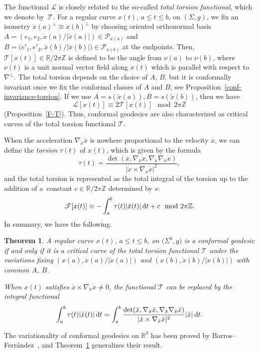 \documentclass[pdftex]{sigma}
\numberwithin{equation}{section}
\newtheorem{Theorem}{Theorem}[section]
\begin{document}
The functional $\mathscr{L}$ is closely related to the so-called {\it total torsion functional}, which we denote by~$\mathscr{T}$. For a regular curve $x(t)$, $a\le t\le b$, on $(\Sigma, g)$, we fix an isometry $\dot x(a)^\perp\cong\dot x(b)^\perp$ by choosing oriented orthonormal basis $A=(e_1, e_2, \dot x(a)/|\dot x(a)|)\in \mathcal{P}_{x(a)}$ and $B=\bigl(e'_1, e'_2, \dot x(b)/|\dot x(b)|\bigr)\in \mathcal{P}_{x(b)}$ at the endpoints. Then, $\mathscr{T}[x(t)]\in\mathbb{R}/2\pi\mathbb{Z}$ is defined to be the angle from $\nu(a)$ to $\nu(b)$, where~$\nu(t)$ is a unit normal vector field along $x(t)$ which is parallel with respect to $\nabla^\perp$. The total torsion depends on the choice of $A$, $B$, but it is
conformally invariant once we fix the conformal classes of $A$ and $B$; see Proposition~\ref{conf-invariance-torsion}. If we use $A=s(\tilde x(a)), B=s(\tilde x(b))$, then we have
\[
\mathscr{L}[x(t)]\equiv 2\mathscr{T}[x(t)] \mod 2\pi\mathbb{Z}
\]
(Proposition~\ref{F-T}). Thus, conformal geodesics are also characterized as critical curves of the total torsion functional $\mathscr{T}$.

When the acceleration $\nabla_{\dot x}\dot x$ is nowhere proportional to the velocity $\dot x$, we can define the {\it torsion} $\tau(t)$ of $x(t)$, which is given by the formula
\[
\tau(t)=\frac{\det (\dot x, \nabla_{\dot x}\dot x, \nabla_{\dot x}\nabla_{\dot x}\dot x)}{|\dot x\times \nabla_{\dot x}\dot x|^2},
\]
and the total torsion is represented as the total integral of the torsion up to the addition of a~constant $c\in\mathbb{R}/2\pi\mathbb{Z}$ determined by $s$:
\[
\mathscr{T}[x(t)]\equiv-\int_a^b\tau(t)|\dot x(t)|\,{\rm d}t+c\mod 2\pi\mathbb{Z}.
\]
In summary, we have the following.

\begin{Theorem}\label{conf-geod-total-torsion}
A regular curve $x(t)$, $a\le t\le b$, on $\bigl(\Sigma^3, g\bigr)$ is a conformal geodesic if and only if it is a critical curve of the total torsion functional $\mathscr{T}$ under the variations fixing $(x(a), \dot x(a)/|\dot x(a)|)$ and $(x(b), \dot x(b)/|\dot x(b)|)$ with common $A$, $B$.

When $x(t)$ satisfies $\dot x\times \nabla_{\dot x}\dot x\neq0$, the functional $\mathscr{T} $ can be replaced by the integral functional
\[
\int_a^b \tau(t)|\dot x(t)|\,{\rm d}t=\int_a^b \frac{\det (\dot x, \nabla_{\dot x}\dot x, \nabla_{\dot x}\nabla_{\dot x}\dot x)}{|\dot x\times \nabla_{\dot x}\dot x|^2}|\dot x|\,{\rm d}t.
\]
\end{Theorem}
The variationality of conformal geodesics on $\mathbb{R}^3$ has been proved by
 Barros--Ferr\'andez~\cite{BF1, BF2}, and Theorem~\ref{conf-geod-total-torsion} generalizes their result.
\end{document}
